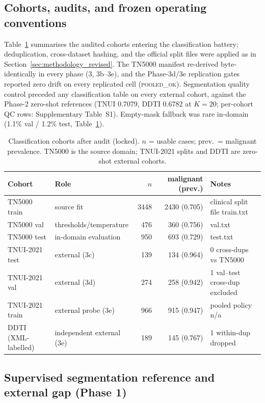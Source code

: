 \documentclass[jimh,article,submit,moreauthors,pdftex]{Definitions/tsp}
\begin{document}
\subsection{Cohorts, audits, and frozen operating conventions}
\label{subsec:res_cohorts}

Table~\ref{tab:cohorts} summarises the audited cohorts entering the
classification battery; deduplication, cross-dataset hashing, and the
official split files were applied as in
Section~\ref{sec:methodology_revised}. The TN5000 manifest re-derived
byte-identically in every phase (3, 3b--3e), and the Phase-3d/3e
replication gates reported zero drift on every replicated cell
(\textsc{pooled\_ok}). Segmentation quality control preceded any
classification table on every external cohort, against the Phase-2
zero-shot references (TNUI 0.7079, DDTI 0.6782 at $K{=}20$; per-cohort
QC rows: Supplementary Table~S1). Empty-mask fallback was rare
in-domain (1.1\% val / 1.2\% test, Table~\ref{tab:cohorts}).

\begin{table}[!ht]
\centering\scriptsize
\setlength{\tabcolsep}{4pt}
\caption{Classification cohorts after audit (locked). $n$ = usable cases;
prev.\ = malignant prevalence. TN5000 is the source domain; TNUI-2021 splits
and DDTI are zero-shot external cohorts.}
\label{tab:cohorts}
\begin{tabular}{llrrl}
\toprule
Cohort & Role & $n$ & malignant (prev.) & Notes \\
\midrule
TN5000 train & source fit & 3448 & 2430 (0.705) & clinical split file train.txt \\
TN5000 val   & thresholds/temperature & 476 & 360 (0.756) & val.txt \\
TN5000 test  & in-domain evaluation & 950 & 693 (0.729) & test.txt \\
TNUI-2021 test  & external (3c) & 139 & 134 (0.964) & 0 cross-dups vs TN5000 \\
TNUI-2021 val   & external (3d) & 274 & 258 (0.942) & 1 val--test cross-dup excluded \\
TNUI-2021 train & external probe (3e) & 966 & 915 (0.947) & pooled policy n/a \\
DDTI (XML-labelled) & independent external (3e) & 189 & 145 (0.767) & 1 within-dup dropped \\
\bottomrule
\end{tabular}
\end{table}

\subsection{Supervised segmentation reference and external gap (Phase 1)}
\label{subsec:res_phase1}
\end{document}
